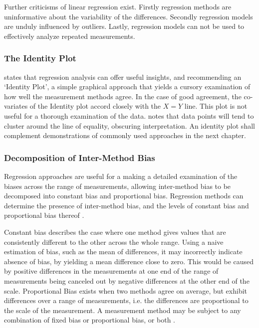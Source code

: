 \documentclass[12pt, a4paper]{report}
\theoremstyle{plain}
\theoremstyle{definition}
\theoremstyle{remark}
\begin{document}
	Further criticisms of linear regression exist.
	Firstly regression methods are uninformative about the variability of the differences. Secondly regression models are unduly influenced by outliers. Lastly, regression models can not be used to effectively analyze repeated measurements.	

		

	
 

	
	\subsubsection*{The Identity Plot}
	\citet{BA83} states that regression analysis can offer useful insights, and recommending an `Identity Plot', a simple graphical approach that yields a cursory examination of how well the measurement methods agree. In the case of good agreement, the co-variates of the Identity plot accord closely with the $X=Y$ line. This plot is not useful for a thorough examination of the data. \citet{BritHypSoc} notes that data points will tend to cluster around the line of equality,
	obscuring interpretation. An identity plot shall complement demonstrations of commonly used approaches in the next chapter.
	
	
	\subsubsection*{Decomposition of Inter-Method Bias}
Regression approaches are useful for a making a detailed examination of the biases across the range of measurements, allowing inter-method bias to be decomposed into constant bias and proportional bias. Regression methods can determine the presence of inter-method bias, and the levels of constant bias and proportional bias thereof \cite{ludbrook97,ludbrook02}. 

Constant bias describes the case where one method gives values that are consistently different to the other across the whole range. Using a naive estimation of bias, such as the mean of differences, it may incorrectly indicate absence of bias, by yielding a mean difference close to zero. This would be caused by positive differences in the measurements at one end of the range of measurements being canceled out by negative differences at the other end of the scale. Proportional Bias exists when two methods agree on average, but exhibit differences over a range of measurements, i.e. the differences are proportional to the scale of the measurement.	A measurement method may be subject to any combination of fixed bias or proportional bias, or both \citep{ludbrook02}. 
	
\end{document}
